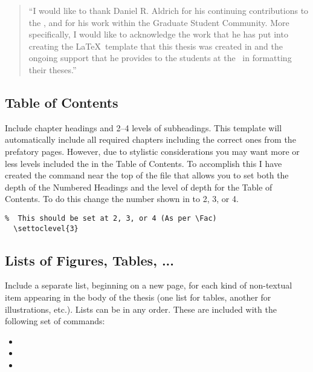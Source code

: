 			\begin{quote}
				\enquote{I would like to thank Daniel R. Aldrich for his continuing contributions to the \University, and for his work within the Graduate Student Community. More specifically, I would like to acknowledge the work that he has put into creating the \LaTeX\ template that this thesis was created in and the ongoing support that he provides to the students at the \University\ in formatting their theses.}
			\end{quote}

		\subsection{Table of Contents}\label{toc}
			Include chapter headings and 2--4 levels of subheadings. 
			This template will automatically include all required chapters including the correct ones from the prefatory pages.
			However, due to stylistic considerations you may want more or less levels included the in the Table of Contents.
			To accomplish this I have created the command near the top of the  file that allows you to set both the depth of the Numbered Headings and the level of depth for the Table of Contents.
			To do this change the number shown in  to 2, 3, or 4.
			\begin{lstlisting}[float=ht,caption=Set Numbered Heading and ToC Level,label=lst:tocLevels,style=LaTeXStyle,basicstyle=\scriptsize\ttfamily,]
% Option to change the Level of subheading included in the Table of Contents
%  This should be set at 2, 3, or 4 (As per \Fac)
  \settoclevel{3}
			\end{lstlisting}


		\subsection{Lists of Figures, Tables, ...}\label{listsof}
			Include a separate list, beginning on a new page, for each kind of non-textual item appearing in the body of the thesis (one list for tables, another for illustrations, etc.).
			Lists can be in any order.
			These are included with the following set of commands:
			\begin{itemize}
				\item {}
				\item {}
				\item {}
			\end{itemize}
			
